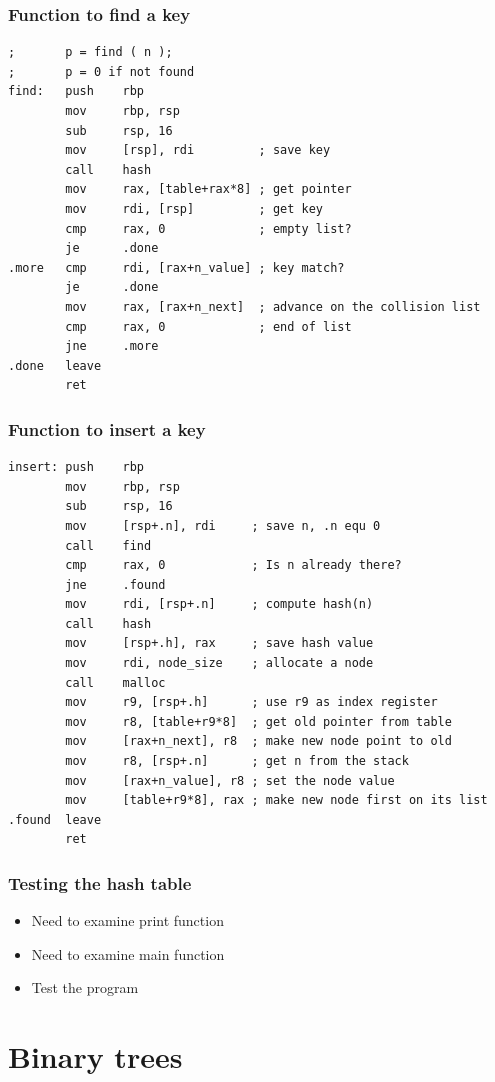 \documentclass{beamer}
\begin{document}
\begin{frame}[fragile]
    \frametitle{Function to find a key}
\small
\begin{verbatim}
;       p = find ( n );
;       p = 0 if not found
find:   push    rbp
        mov     rbp, rsp
        sub     rsp, 16
        mov     [rsp], rdi         ; save key
        call    hash
        mov     rax, [table+rax*8] ; get pointer
        mov     rdi, [rsp]         ; get key
        cmp     rax, 0             ; empty list?
        je      .done
.more   cmp     rdi, [rax+n_value] ; key match?
        je      .done
        mov     rax, [rax+n_next]  ; advance on the collision list
        cmp     rax, 0             ; end of list
        jne     .more
.done   leave
        ret
\end{verbatim}
\end{frame}

\begin{frame}[fragile]
    \frametitle{Function to insert a key}
\small
\begin{verbatim}
insert: push    rbp
        mov     rbp, rsp
        sub     rsp, 16
        mov     [rsp+.n], rdi     ; save n, .n equ 0
        call    find
        cmp     rax, 0            ; Is n already there?
        jne     .found
        mov     rdi, [rsp+.n]     ; compute hash(n)
        call    hash
        mov     [rsp+.h], rax     ; save hash value
        mov     rdi, node_size    ; allocate a node
        call    malloc
        mov     r9, [rsp+.h]      ; use r9 as index register
        mov     r8, [table+r9*8]  ; get old pointer from table
        mov     [rax+n_next], r8  ; make new node point to old
        mov     r8, [rsp+.n]      ; get n from the stack
        mov     [rax+n_value], r8 ; set the node value
        mov     [table+r9*8], rax ; make new node first on its list
.found  leave
        ret
\end{verbatim}
\end{frame}

\begin{frame}
    \frametitle{Testing the hash table}
    \begin{itemize}
        \item Need to examine print function
        \item Need to examine main function
        \item Test the program
    \end{itemize}
\end{frame}

\section{Binary trees}
\end{document}
